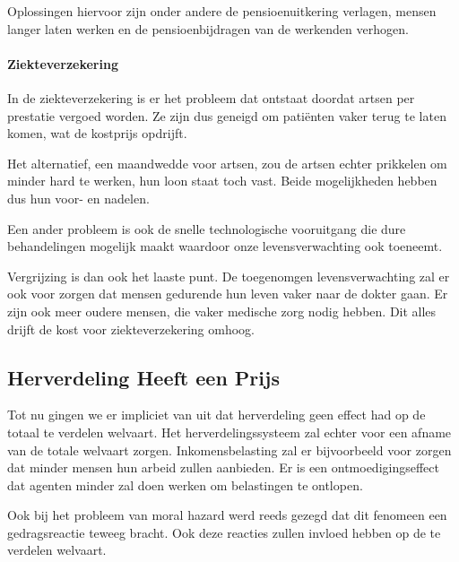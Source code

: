 Oplossingen hiervoor zijn onder andere de pensioenuitkering verlagen, mensen langer laten werken en de pensioenbijdragen van de werkenden verhogen.

\paragraph{Ziekteverzekering} In de ziekteverzekering is er het probleem dat ontstaat doordat artsen per prestatie vergoed worden. Ze zijn dus geneigd om pati\"enten vaker terug te laten komen, wat de kostprijs opdrijft.

Het alternatief, een maandwedde voor artsen, zou de artsen echter prikkelen om minder hard te werken, hun loon staat toch vast. Beide mogelijkheden hebben dus hun voor- en nadelen.

Een ander probleem is ook de snelle technologische vooruitgang die dure behandelingen mogelijk maakt waardoor onze levensverwachting ook toeneemt.

Vergrijzing is dan ook het laaste punt. De toegenomgen levensverwachting zal er ook voor zorgen dat mensen gedurende hun leven vaker naar de dokter gaan. Er zijn ook meer oudere mensen, die vaker medische zorg nodig hebben. Dit alles drijft de kost voor ziekteverzekering omhoog.

\subsection{Herverdeling Heeft een Prijs}
Tot nu gingen we er impliciet van uit dat herverdeling geen effect had op de totaal te verdelen welvaart. Het herverdelingssysteem zal echter voor een afname van de totale welvaart zorgen. Inkomensbelasting zal er bijvoorbeeld voor zorgen dat minder mensen hun arbeid zullen aanbieden. Er is een ontmoedigingseffect dat agenten minder zal doen werken om belastingen te ontlopen.

Ook bij het probleem van moral hazard werd reeds gezegd dat dit fenomeen een gedragsreactie teweeg bracht. Ook deze reacties zullen invloed hebben op de te verdelen welvaart.

